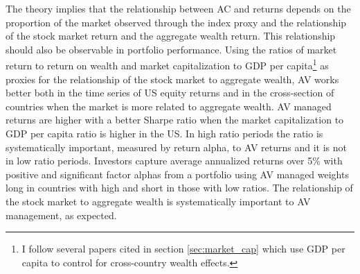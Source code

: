 The \citet{pollet_average_2010} theory implies that the relationship between AC and returns depends on the proportion of the market observed through the index proxy and the relationship of the stock market return and the aggregate wealth return. This relationship should also be observable in portfolio performance. Using the ratios of market return to return on wealth and market capitalization to GDP per capita\footnote{I follow several papers cited in section \ref{sec:market_cap} which use GDP per capita to control for cross-country wealth effects.} as proxies for the relationship of the stock market to aggregate wealth, AV works better both in the time series of US equity returns and in the cross-section of countries when the market is more related to aggregate wealth. AV managed returns are higher with a better Sharpe ratio when the market capitalization to GDP per capita ratio is higher in the US. In high ratio periods the ratio is systematically important, measured by return alpha, to AV returns and it is not in low ratio periods.  Investors capture average annualized returns over 5\% with positive and significant factor alphas from a portfolio using AV managed weights long in countries with high and short in those with low ratios. The relationship of the stock market to aggregate wealth is systematically important to AV management, as expected.

